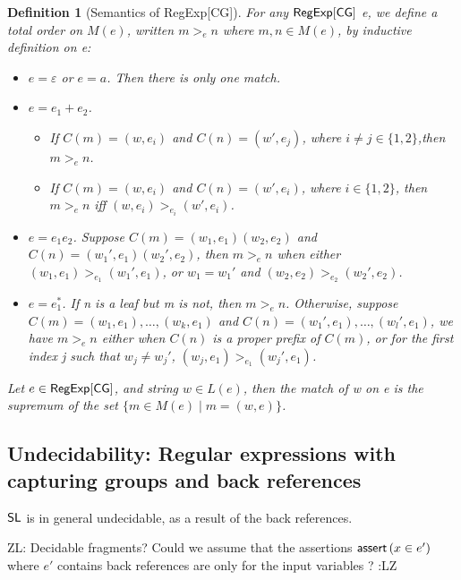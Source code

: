 \documentclass[sigplan,review,anonymous]{acmart}\settopmatter{printfolios=true,printccs=false,printacmref=false}
\newcommand{\zhilin}[1]{\color{brown} {ZL: #1 :LZ} \color{black}}
\newcommand{\zhilin}[1]{}
\newtheorem{definition}{Definition}
\begin{document}
\begin{definition}[Semantics of RegExp{[\sf CG]}]
  For any ${\sf RegExp}[\sf CG]$ e, we define a total order on $M (e)$, written $m
  >_e n$ where $m, n \in M (e)$, by inductive definition on e:
  \begin{itemize}
    \item $e = \varepsilon$ or $e = a$. Then there is only one match.
    
    \item $e = e_1 + e_2$.
    \begin{itemize}
      \item If $C (m) = (w, e_i)$ and $C (n) = (w', e_j)$, where $i \neq j \in
      \{ 1, 2 \}$,then $m >_e n$.
      
      \item If $C (m) = (w, e_i)$ and $C (n) = (w', e_i)$, where $i \in \{ 1,
      2 \}$, then $m >_e n$ iff $(w, e_i) >_{e_i} (w', e_i)$.
    \end{itemize}
    \item $e = e_1 e_2$. Suppose $C (m) = (w_1, e_1) (w_2, e_2)$ and $C (n) =
    (w_1', e_1) (w_2', e_2)$, then $m >_e n$ when either $(w_1, e_1) >_{e_1}
    (w_1', e_1)$, or $w_1 = w_1'$ and $(w_2, e_2) >_{e_2} (w_2', e_2)$.
    
    \item $e = e_1^{\ast}$. If n is a leaf but m is not, then $m >_e n$.
    Otherwise, suppose $C (m) = (w_1, e_1), \ldots, (w_k, e_1)$ and $C (n) =
    (w_1', e_1), \ldots, (w_l', e_1)$, we have $m >_e n$ either when $C (n)$
    is a proper prefix of $C (m)$, or for the first index j such that $w_j
    \neq w_j'$, $(w_j, e_1) >_{e_1} (w_j', e_1)$.
  \end{itemize}
  Let $e \in {\sf RegExp}[\sf CG]$, and string $w \in L (e)$, then the match of w
  on e is the supremum of the set $\{ m \in M (e) \mid m = (w, e) \}$.
\end{definition}

\subsection{Undecidability: Regular expressions with capturing groups and back references}

$\mathsf{SL}$ is in general undecidable, as a result of the back references.

\zhilin{Decidable fragments? Could we assume that the assertions $\textsf{assert}\left(x \in e'\right)$ where $e'$ contains back references are only for the input variables ?}
\end{document}
